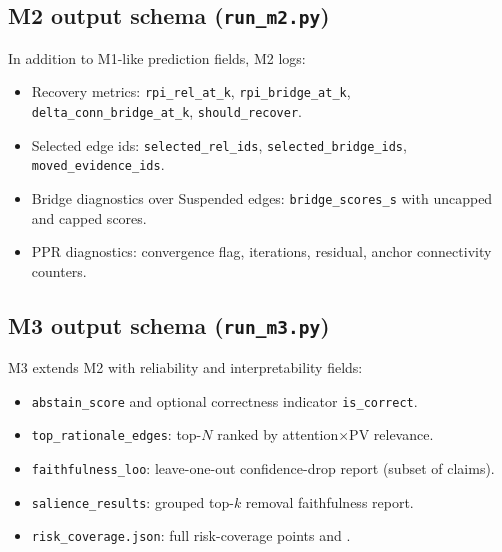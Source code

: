 \subsection{M2 output schema (\texttt{run\_m2.py})}
In addition to M1-like prediction fields, M2 logs:
\begin{itemize}
\item Recovery metrics: \texttt{rpi\_rel\_at\_k}, \texttt{rpi\_bridge\_at\_k}, \texttt{delta\_conn\_bridge\_at\_k}, \texttt{should\_recover}.
\item Selected edge ids: \texttt{selected\_rel\_ids}, \texttt{selected\_bridge\_ids}, \texttt{moved\_evidence\_ids}.
\item Bridge diagnostics over Suspended edges: \texttt{bridge\_scores\_s} with uncapped and capped scores.
\item PPR diagnostics: convergence flag, iterations, residual, anchor connectivity counters.
\end{itemize}

\subsection{M3 output schema (\texttt{run\_m3.py})}
M3 extends M2 with reliability and interpretability fields:
\begin{itemize}
\item \texttt{abstain\_score} and optional correctness indicator \texttt{is\_correct}.
\item \texttt{top\_rationale\_edges}: top-$N$ ranked by attention$\times$PV relevance.
\item \texttt{faithfulness\_loo}: leave-one-out confidence-drop report (subset of claims).
\item \texttt{salience\_results}: grouped top-$k$ removal faithfulness report.
\item \texttt{risk\_coverage.json}: full risk-coverage points and \AURC.
\end{itemize}

